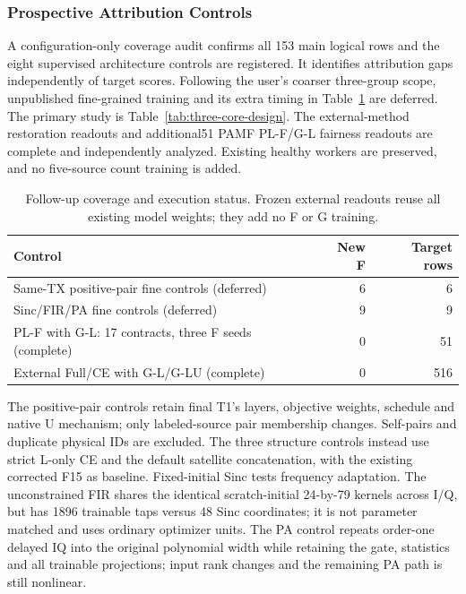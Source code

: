 \subsubsection{Prospective Attribution Controls}
A configuration-only coverage audit confirms all 153 main logical rows and the eight supervised architecture controls are registered. It identifies attribution gaps independently of target scores. Following the user's coarser three-group scope, unpublished fine-grained training and its extra timing in Table~\ref{tab:completeness-followup} are deferred. The primary study is Table~\ref{tab:three-core-design}. The external-method restoration readouts and additional51 PAMF PL-F/G-L fairness readouts are complete and independently analyzed. Existing healthy workers are preserved, and no five-source count training is added.

\begin{table}[t]
\centering\footnotesize
\caption{Follow-up coverage and execution status. Frozen external readouts reuse all existing model weights; they add no F or G training.}
\label{tab:completeness-followup}
\begin{tabular}{p{}rr}
\toprule
Control & New F & Target rows\\
\midrule
Same-TX positive-pair fine controls (deferred) & 6 & 6\\
Sinc/FIR/PA fine controls (deferred) & 9 & 9\\
PL-F with G-L: 17 contracts, three F seeds (complete) & 0 & 51\\
External Full/CE with G-L/G-LU (complete) & 0 & 516\\
\bottomrule
\end{tabular}
\end{table}

The positive-pair controls retain final T1's layers, objective weights, schedule and native U mechanism; only labeled-source pair membership changes. Self-pairs and duplicate physical IDs are excluded. The three structure controls instead use strict L-only CE and the default satellite concatenation, with the existing corrected F15 as baseline. Fixed-initial Sinc tests frequency adaptation. The unconstrained FIR shares the identical scratch-initial 24-by-79 kernels across I/Q, but has 1896 trainable taps versus 48 Sinc coordinates; it is not parameter matched and uses ordinary optimizer units. The PA control repeats order-one delayed IQ into the original polynomial width while retaining the gate, statistics and all trainable projections; input rank changes and the remaining PA path is still nonlinear.

